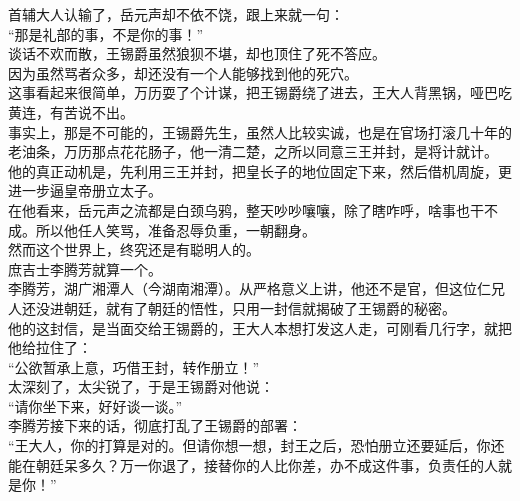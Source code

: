\begin{multicols}{\theparacolNo}
首辅大人认输了，岳元声却不依不饶，跟上来就一句：\\

“那是礼部的事，不是你的事！”\\

谈话不欢而散，王锡爵虽然狼狈不堪，却也顶住了死不答应。\\

因为虽然骂者众多，却还没有一个人能够找到他的死穴。\\

这事看起来很简单，万历耍了个计谋，把王锡爵绕了进去，王大人背黑锅，哑巴吃黄连，有苦说不出。\\

事实上，那是不可能的，王锡爵先生，虽然人比较实诚，也是在官场打滚几十年的老油条，万历那点花花肠子，他一清二楚，之所以同意三王并封，是将计就计。\\

他的真正动机是，先利用三王并封，把皇长子的地位固定下来，然后借机周旋，更进一步逼皇帝册立太子。\\

在他看来，岳元声之流都是白颈乌鸦，整天吵吵嚷嚷，除了瞎咋呼，啥事也干不成。所以他任人笑骂，准备忍辱负重，一朝翻身。\\

然而这个世界上，终究还是有聪明人的。\\

庶吉士李腾芳就算一个。\\

李腾芳，湖广湘潭人（今湖南湘潭）。从严格意义上讲，他还不是官，但这位仁兄人还没进朝廷，就有了朝廷的悟性，只用一封信就揭破了王锡爵的秘密。\\

他的这封信，是当面交给王锡爵的，王大人本想打发这人走，可刚看几行字，就把他给拉住了：\\

“公欲暂承上意，巧借王封，转作册立！”\\

太深刻了，太尖锐了，于是王锡爵对他说：\\

“请你坐下来，好好谈一谈。”\\

李腾芳接下来的话，彻底打乱了王锡爵的部署：\\

“王大人，你的打算是对的。但请你想一想，封王之后，恐怕册立还要延后，你还能在朝廷呆多久？万一你退了，接替你的人比你差，办不成这件事，负责任的人就是你！”\\


\end{multicols}
